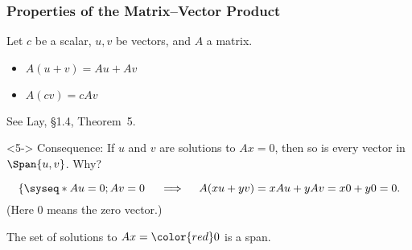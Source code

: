 
\begin{frame}
\frametitle{Properties of the Matrix--Vector Product}

\begin{bluebox}{.65\textwidth}
  Let $c$ be a scalar, $u,v$ be vectors, and $A$ a matrix.

  \pause\smallskip
  \begin{itemize}
  \item $A(u+v) = Au + Av$
    \pause
  \item $A(cv) = cAv$
  \end{itemize}

  \pause\smallskip
  {\small\color{black!60}See Lay, \S1.4, Theorem~5.}
\end{bluebox}


\bigskip
\begin{uncoverenv}<5->
  \alert{Consequence:}
  If $u$ and $v$ are solutions to $Ax = 0$, then so is every vector in 
  $\Span\{u,v\}$.
  \pause[6]
  Why?
  \begin{webonly}
  \[ \left\{\syseq*{Au = 0; Av = 0}\right.
  \quad\implies\quad
  A(xu+yv) = xAu + yAv = x0 + y0 = 0. \]
  (Here $0$ means the zero vector.)
  \end{webonly}

  \pause

  \begin{bluebox}[Important]{.65\textwidth}
    The set of solutions to $Ax = \color{red}0$ is a span.
  \end{bluebox}

\end{uncoverenv}

\end{frame}


